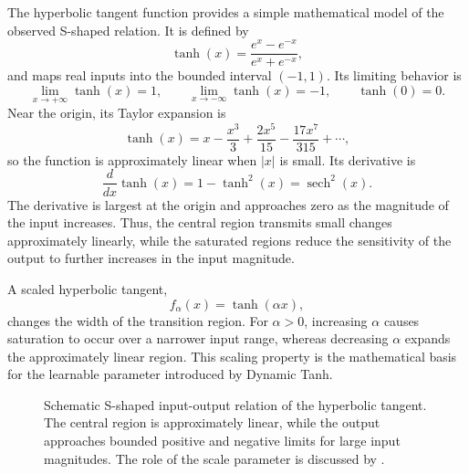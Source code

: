The hyperbolic tangent function provides a simple mathematical model of
the observed S-shaped relation. It is defined by
\begin{equation}
    \tanh(x)
    =
    \frac{e^x-e^{-x}}{e^x+e^{-x}},
    \label{eq:norm-tanh-definition}
\end{equation}
and maps real inputs into the bounded interval \((-1,1)\). Its limiting
behavior is
\begin{equation}
    \lim_{x\to+\infty}\tanh(x)=1,
    \qquad
    \lim_{x\to-\infty}\tanh(x)=-1,
    \qquad
    \tanh(0)=0.
    \label{eq:norm-tanh-limits}
\end{equation}
Near the origin, its Taylor expansion is
\begin{equation}
    \tanh(x)
    =
    x-\frac{x^3}{3}
    +\frac{2x^5}{15}
    -\frac{17x^7}{315}
    +\cdots,
    \label{eq:norm-tanh-taylor}
\end{equation}
so the function is approximately linear when \(|x|\) is small. Its
derivative is
\begin{equation}
    \frac{d}{dx}\tanh(x)
    =
    1-\tanh^2(x)
    =
    \operatorname{sech}^2(x).
    \label{eq:norm-tanh-derivative}
\end{equation}
The derivative is largest at the origin and approaches zero as the
magnitude of the input increases. Thus, the central region transmits
small changes approximately linearly, while the saturated regions reduce
the sensitivity of the output to further increases in the input magnitude.

A scaled hyperbolic tangent,
\begin{equation}
    f_{\alpha}(x)=\tanh(\alpha x),
    \label{eq:norm-scaled-tanh}
\end{equation}
changes the width of the transition region. For \(\alpha>0\), increasing
\(\alpha\) causes saturation to occur over a narrower input range, whereas
decreasing \(\alpha\) expands the approximately linear region. This
scaling property is the mathematical basis for the learnable parameter
introduced by Dynamic Tanh.

\begin{figure}[htbp]
    \centering
    
    \caption{Schematic S-shaped input-output relation of the hyperbolic
    tangent. The central region is approximately linear, while the output
    approaches bounded positive and negative limits for large input
    magnitudes. The role of the scale parameter is discussed by
    \textcite{zhu2025dyt}.}
    \label{fig:norm-tanh-curve}
\end{figure}

